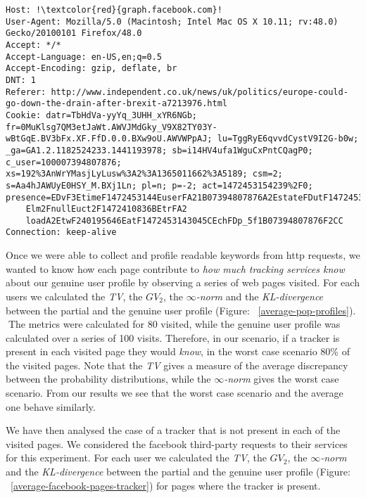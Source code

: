 \begin{lstlisting}[frame=single, breaklines=true, keepspaces=true, basicstyle=\tiny, escapechar=!]
Host: !\textcolor{red}{graph.facebook.com}!
User-Agent: Mozilla/5.0 (Macintosh; Intel Mac OS X 10.11; rv:48.0) Gecko/20100101 Firefox/48.0
Accept: */*
Accept-Language: en-US,en;q=0.5
Accept-Encoding: gzip, deflate, br
DNT: 1
Referer: http://www.independent.co.uk/news/uk/politics/europe-could-go-down-the-drain-after-brexit-a7213976.html
Cookie: datr=TbHdVa-yyYq_3UHH_xYR6NGb; fr=0MuKlsg7QM3etJaWt.AWVJMdGky_V9X82TY03Y-wBtGqE.BV3bFx.XF.FfD.0.0.BXw9oU.AWVWPpAJ; lu=TggRyE6qvvdCystV9I2G-b0w; _ga=GA1.2.1182524233.1441193978; sb=i14HV4ufa1WguCxPntCQagP0; c_user=100007394807876; xs=192%3AnWrYMasjLyLusw%3A2%3A1365011662%3A5189; csm=2; s=Aa4hJAWUyE0HSY_M.BXj1Ln; pl=n; p=-2; act=1472453154239%2F0; presence=EDvF3EtimeF1472453144EuserFA21B07394807876A2EstateFDutF1472453144216Et2F_5b_5d
    Elm2FnullEuct2F1472410836BEtrFA2
    loadA2EtwF240195646EatF1472453143045CEchFDp_5f1B07394807876F2CC
Connection: keep-alive
\end{lstlisting}

Once we were able to collect and profile readable keywords from http requests, we wanted to know how each page contribute to \emph{how much tracking services know} about our genuine user profile by observing a series of web pages visited.
For each users we calculated the \emph{TV}, the \emph{$GV_2$}, the \emph{$\infty$-norm} and the \emph{KL-divergence} between the partial and the genuine user profile (Figure: ~\ref{average-pop-profiles}). 
The metrics were calculated for 80 visited, while the genuine user profile was calculated over a series of 100 visits. Therefore, in our scenario, if a tracker is present in each visited page they would \emph{know}, in the worst case scenario 80\% of the visited pages.
Note that the \emph{TV} gives a measure of the average discrepancy between the probability distributions, while the \emph{$\infty$-norm} gives the worst case scenario. From our results we see that the worst case scenario and the average one behave similarly.

We have then analysed the case of a tracker that is not present in each of the visited pages. We considered the facebook third-party requests to their services for this experiment. For each user we calculated the \emph{TV}, the \emph{$GV_2$}, the \emph{$\infty$-norm} and the \emph{KL-divergence} between the partial and the genuine user profile (Figure: ~\ref{average-facebook-pages-tracker}) for pages where the tracker is present.


